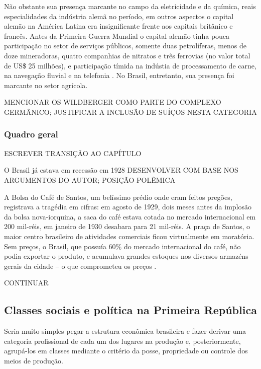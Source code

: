 Não obstante sua presença marcante no campo da eletricidade e da química, reais especialidades da indústria alemã no período, em outros aspectos o capital alemão na América Latina era insignificante frente aos capitais britânico e francês. Antes da Primeira Guerra Mundial o capital alemão tinha pouca participação no setor de serviços públicos, somente duas petrolíferas, menos de doze mineradoras, quatro companhias de nitratos e três ferrovias (no valor total de US\$ 25 milhões), e participação tímida na indústia de processamento de carne, na navegação fluvial e na telefonia \cite{rippy_german_1948}. No Brasil, entretanto, sua presença foi marcante no setor agrícola.

MENCIONAR OS WILDBERGER COMO PARTE DO COMPLEXO GERMÂNICO; JUSTIFICAR A INCLUSÃO DE SUÍÇOS NESTA CATEGORIA

\subsubsection{Quadro geral}\label{subsubsec:quager}

ESCREVER TRANSIÇÃO AO CAPÍTULO

O Brasil já estava em recessão em 1928 \cite{hautcoeur_1929_2009} DESENVOLVER COM BASE NOS ARGUMENTOS DO AUTOR; POSIÇÃO POLÊMICA

A Bolsa do Café de Santos, um belíssimo prédio onde eram feitos pregões, registrava a tragédia em cifras: em agosto de 1929, dois meses antes da implosão da bolsa nova-iorquina, a saca do café estava cotada no mercado internacional em 200 mil-réis, em janeiro de 1930 desabara para 21 mil-réis. A praça de Santos, o maior centro brasileiro de atividades comerciais ficou virtualmente em moratória. Sem preços, o Brasil, que possuía 60\% do mercado internacional do café, não podia exportar o produto, e acumulava grandes estoques nos diversos armazéns gerais da cidade -- o que comprometeu os preços \cite{hautcoeur_1929_2009}.

CONTINUAR

\subsection{Classes sociais e política na Primeira República}\label{subsec:clapolprire}

Seria muito simples pegar a estrutura econômica brasileira e fazer derivar uma categoria profissional de cada um dos lugares na produção e, posteriormente, agrupá-los em classes mediante o critério da posse, propriedade ou controle dos meios de produção. 

